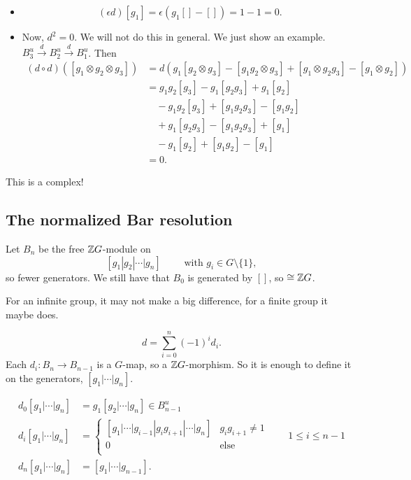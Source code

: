 \begin{itemize}
    \item \[
            (\epsilon d) [g_1] = \epsilon( g_1[] - []) = 1 - 1 = 0
        .\] 
    \item Now, $d^2 = 0$. We will not do this in general.
        We just show an example. $B^u_3 \xrightarrow{d} B^u_2 \xrightarrow{d} B^u_1$.
        Then
        \begin{align*}
            (d  \circ  d) ([g_1 \otimes g_2 \otimes g_3]) &= d(g_1[g_2 \otimes g_3] - [g_1g_2 \otimes g_3] + [g_1 \otimes g_2 g_3] - [g_1 \otimes g_2])\\
                                                          &= g_1 g_2[g_3] - g_1[g_2g_3] + g_1[g_2]\\
                                                          & \quad - g_1 g_2[g_3] + [g_1 g_2 g_3] - [g_1g_2]\\
                                                          & \quad + g_1[g_2g_3] - [g_1g_2g_3] + [g_1]\\
                                                          & \quad - g_1[g_2] + [g_1g_2] - [g_1]\\
                                                          &= 0
        .\end{align*} 
\end{itemize}

This is a complex!

\subsection*{The normalized Bar resolution}

Let $ B_n $ be the free $\mathbb{Z} G$-module on
\[
    [g_1|g_2|\cdots | g_n] \qquad \text{ with } g_i \in  G \setminus \{1\} 
,\] 
so fewer generators.
We still have that $B_0$ is generated by $[]$, so  $\cong \mathbb{Z} G$.

\begin{remark}
    For an infinite group, it may not make a big difference, for a finite group it maybe does.
\end{remark}


\[
    d = \sum_{i=0}^{n} (-1)^{i} d_i
.\] 
Each $d_i: B_n \to  B_{n-1}$ is a $G$-map, so a $\mathbb{Z} G$-morphism.
So it is enough to define it on the generators, $[g_1 | \cdots | g_n]$.

\begin{align*}
    d_0[g_1 | \cdots | g_n] &= g_1 [ g_2 | \cdots | g_n] \in B^u_{n-1}\\
    d_i[g_1 | \cdots | g_n] &=
    \begin{cases}
        [g_1 | \cdots | g_{i-1} | g_i g_{i+1} | \cdots | g_n]  & g_i g_{i+1} \neq 1\\
        0 & \text{else} \\
    \end{cases}
\qquad 1 \le i \le  n-1
    \\
    d_n[g_1 | \cdots | g_n] &= [g_1 | \cdots | g_{n-1}]
.\end{align*}

